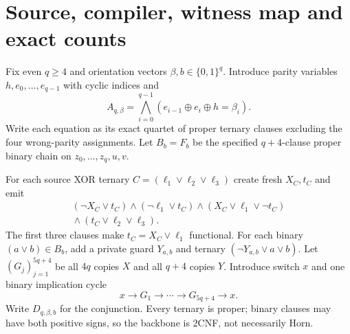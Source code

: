 \documentclass[11pt]{article}
\begin{document}
\section{Source, compiler, witness map and exact counts}
Fix even $q\ge4$ and orientation vectors $\beta,b\in\{0,1\}^q$.
Introduce parity variables $h,e_0,\ldots,e_{q-1}$ with cyclic indices and
\[
A_{q,\beta}=\bigwedge_{i=0}^{q-1}
(e_{i-1}\oplus e_i\oplus h=\beta_i). \tag{1}
\]
Write each equation as its exact quartet of proper ternary clauses
excluding the four wrong-parity assignments.
Let $B_b=F_b$ be the specified $q+4$-clause proper binary
chain on $z_0,\ldots,z_q,u,v$.

For each source XOR ternary $C=(\ell_1\vee\ell_2\vee\ell_3)$
create fresh $X_C,t_C$ and emit
\begin{equation}
\begin{split}
 (\neg X_C\vee t_C)\land(\neg\ell_1\vee t_C)
 \land(X_C\vee\ell_1\vee\neg t_C)\\
 {}\land(t_C\vee\ell_2\vee\ell_3).
\end{split}\tag{2}
\end{equation}
The first three clauses make $t_C=X_C\vee\ell_1$
functional. For each binary $(a\vee b)\in B_b$, add a private guard
$Y_{a,b}$ and ternary $(\neg Y_{a,b}\vee a\vee b)$.
Let $(G_j)_{j=1}^{5q+4}$ be all $4q$ copies $X$ and all
$q+4$ copies $Y$. Introduce switch $x$ and one binary implication cycle
\[
x\to G_1\to\cdots\to G_{5q+4}\to x. \tag{3}
\]
Write $D_{q,\beta,b}$ for the conjunction.
Every ternary is proper; binary clauses may have both positive signs,
so the backbone is 2CNF, not necessarily Horn.
\end{document}
